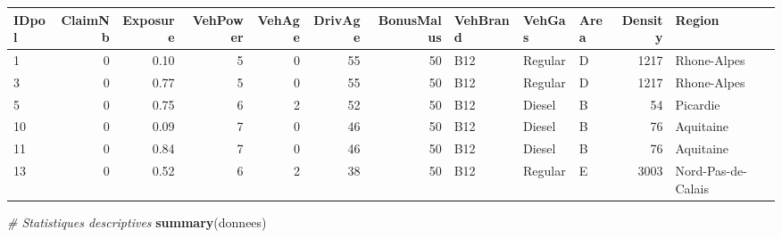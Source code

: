 \documentclass[
  french,
]{book}
\newenvironment{Shaded}{\begin{snugshade}}{\end{snugshade}}
\newcommand{\CommentTok}[1]{\textcolor[rgb]{0.56,0.35,0.01}{\textit{#1}}}
\newcommand{\FunctionTok}[1]{\textcolor[rgb]{0.13,0.29,0.53}{\textbf{#1}}}
\newcommand{\NormalTok}[1]{#1}
\theoremstyle{definition}
\theoremstyle{definition}
\theoremstyle{definition}
\theoremstyle{definition}
\theoremstyle{remark}
\begin{document}
\begin{table}
\centering
\begin{tabular}{l|r|r|r|r|r|r|l|l|l|r|l}
\hline
IDpol & ClaimNb & Exposure & VehPower & VehAge & DrivAge & BonusMalus & VehBrand & VehGas & Area & Density & Region\\
\hline
1 & 0 & 0.10 & 5 & 0 & 55 & 50 & B12 & Regular & D & 1217 & Rhone-Alpes\\
\hline
3 & 0 & 0.77 & 5 & 0 & 55 & 50 & B12 & Regular & D & 1217 & Rhone-Alpes\\
\hline
5 & 0 & 0.75 & 6 & 2 & 52 & 50 & B12 & Diesel & B & 54 & Picardie\\
\hline
10 & 0 & 0.09 & 7 & 0 & 46 & 50 & B12 & Diesel & B & 76 & Aquitaine\\
\hline
11 & 0 & 0.84 & 7 & 0 & 46 & 50 & B12 & Diesel & B & 76 & Aquitaine\\
\hline
13 & 0 & 0.52 & 6 & 2 & 38 & 50 & B12 & Regular & E & 3003 & Nord-Pas-de-Calais\\
\hline
\end{tabular}
\end{table}

\begin{Shaded}
\begin{Highlighting}[]
\CommentTok{\# Statistiques descriptives}
\FunctionTok{summary}\NormalTok{(donnees)}
\end{Highlighting}
\end{Shaded}
\end{document}
